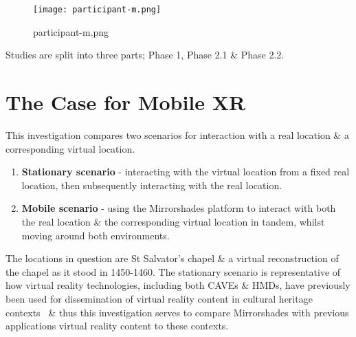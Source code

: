 \begin{figure}[h]
	\begin{center}
		\texttt{[image: participant-m.png]}
		\caption{participant-m.png}
		\label{participant-m.png}
	\end{center}
\end{figure}

Studies are split into three parts; Phase 1, Phase 2.1 \& Phase 2.2.

\section{The Case for Mobile XR}
This investigation compares two scenarios for interaction with a real location \& a corresponding virtual location.

\begin{enumerate}
	\item \textbf{Stationary scenario} - interacting with the virtual location from a fixed real location, then subsequently interacting with the real location.
	\item \textbf{Mobile scenario} - using the Mirrorshades platform to interact with both the real location \& the corresponding virtual location in tandem, whilst moving around both environments.
\end{enumerate}

The locations in question are St Salvator's chapel \& a virtual reconstruction of the chapel as it stood in 1450-1460. The stationary scenario is representative of how virtual reality technologies, including both CAVEs \& HMDs, have previously been used for dissemination of virtual reality content in cultural heritage contexts~\cite{Roussou2002} \& thus this investigation serves to compare Mirrorshades with previous applications virtual reality content to these contexts.

